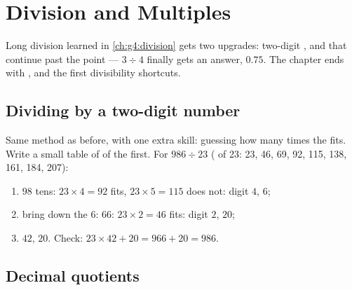 \chapter{Division and Multiples}\label{ch:g5:division}

Long division learned in \cref{ch:g4:division} gets two upgrades:
two-digit , and  that continue past the point ---
$3 \div 4$ finally gets an answer, $0.75$. The chapter ends with
,  and the first divisibility shortcuts.

\section{Dividing by a two-digit number}

\begin{method}\label{met:g5:division:twodigits}
Same method as before, with one extra skill: guessing how many times
the  fits. Write a small table of  of the 
first. For $986 \div 23$ ( of 23: 23, 46, 69, 92, 115,
138, 161, 184, 207):
\begin{enumerate}
  \item $98$ tens: $23 \times 4 = 92$ fits, $23 \times 5 = 115$ does
        not: digit $4$,  $6$;
  \item bring down the $6$: $66$: $23 \times 2 = 46$ fits: digit
        $2$,  $20$;
  \item {} $42$,  $20$. Check:
        $23 \times 42 + 20 = 966 + 20 = 986$.
\end{enumerate}
\end{method}

\section{Decimal quotients}

